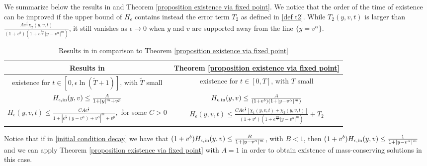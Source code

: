 \documentclass[11pt]{article}
\numberwithin{equation}{section}
\begin{document}
We summarize below the results in \cite{cristianinhom} and Theorem \ref{proposition existence via fixed point}. We notice that the order of the time of existence can be improved if the upper bound of $H_{\epsilon}$ contains instead the error term $T_{2}$ as defined in \eqref{def t2}. While $T_{2}(y,v,t)$ is larger than $\frac{Ae^{\frac{t}{\epsilon}}\chi_{2}(y,v,t)}{(1+v^{b})(1+e^{\frac{tm}{\epsilon}}|y-v^{\alpha}|^{m})}$, it still vanishes as $\epsilon\rightarrow 0$ when $y$ and $v$ are supported away from the line $\{y=v^{\alpha}\}$.
\begin{table}[H]
    \centering
    \begin{tabular}{|c||c|}
    \hline
  Results in \cite{cristianinhom}& Theorem \ref{proposition existence via fixed point}\\
        \hline
        \hline
       existence for $t\in[0,\epsilon\ln(\tilde{T}+1)]$, with $\tilde{T}$ small & existence for $t\in[0,T]$, with $T$ small \\
         \hline
        $H_{\epsilon,\textup{in}}(y,v)\leq \frac{A}{1+|y|^{m}+v^{p}}$ &     $H_{\epsilon,\textup{in}}(y,v)\leq \frac{A}{(1+v^{b})(1+|y-v^{\alpha}|^{m})}$\\
        \hline
              $H_{\epsilon}(y,v,t)\leq \frac{C Ae^{\frac{t}{\epsilon}}}{1+|e^{\frac{t}{\epsilon}}(y-v^{\alpha})+v^{\alpha}|^{m}+v^{p}},$ for some $C>0$ &     $H_{\epsilon}(y,v,t)\leq \frac{C Ae^{\frac{t}{\epsilon}}[\chi_{1}(y,v,t)+\chi_{3}(y,v,t)]}{(1+v^{b})(1+e^{\frac{tm}{\epsilon}}|y-v^{\alpha}|^{m})}+T_{2}$\\ \hline
    \end{tabular}
    \caption{Results in \cite{cristianinhom} in comparison to Theorem \ref{proposition existence via fixed point}}
    \label{tab:my_label two}
\end{table}

\begin{rmk} Notice that if in \eqref{initial condition decay} we have that
 $(1+v^{b}) H_{\epsilon,\textup{in}}(y,v)\leq \frac{B}{1+|y-v^{\alpha}|^{m}}$, with $B<1$, then $(1+v^{b}) H_{\epsilon,\textup{in}}(y,v)\leq \frac{1}{1+|y-v^{\alpha}|^{m}}$ and we can apply Theorem \ref{proposition existence via fixed point} with $A=1$ in order to obtain existence of mass-conserving solutions in this case. 
 \end{rmk}
 
\end{document}
